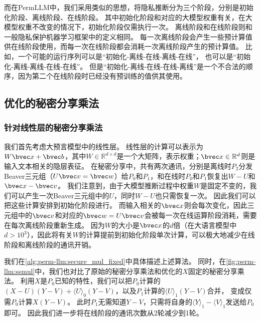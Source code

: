 %
而在PermLLM中，我们采用类似的思想，将隐私推断分为三个阶段，分别是初始化阶段、离线阶段、在线阶段。
%
其中初始化阶段和对应的大模型权重有关，在大模型权重不改变的情况下，初始化阶段仅需执行一次。
%
离线阶段和在线阶段则和一般隐私保护机器学习框架中的定义相同。
每一次离线阶段会产生一些预计算值供在线阶段使用，而每一次在线阶段都会消耗一次离线阶段产生的预计算值。
%
比如，一个可能的运行序列可以是“初始化-离线-在线-离线-在线”，
也可以是“初始化-离线-离线-在线-在线”。
但是“初始化-离线-在线-在线-离线”是一个不合法的顺序，因为第二个在线阶段时已经没有预训练的值供其使用。

\subsection{优化的秘密分享乘法}


\subsubsection{针对线性层的秘密分享乘法}
我们首先考虑大预言模型中的线性层。
%
线性层的计算可以表示为$W \bvec x + \bvec b$，其中$W \in \mathbb R^{d\times d}$是一个大矩阵，表示权重；$\bvec x \in \mathbb R^{d}$则是输入文本相关的隐层表征。
%
在秘密分享中，共有两次通讯，分别是离线时$P_2$分发Beaver三元组（$U\bvec v = \bvec w$）给$P_0$和$P_1$，和在线时$P_0$和$P_1$恢复出$W - U$和$\bvec x - \bvec v$。
%
我们注意到，由于大模型推断过程中权重$W$是固定不变的，我们可以产生一次Beaver三元组中的$U$，同时$W - U$也只需恢复一次。
因此我们可以把这些计算安排到初始化阶段进行。
%
而输入相关的$\bvec x$则会每次变化，因此三元组中的$\bvec v$和对应的$\bvec w=U\bvec v$会被每一次在线运算阶段消耗，需要在每次离线阶段重新生成。
%
因为$W$的大小是$\bvec x$的$d$倍（在大语言模型中$d > 10^3$），因此将有关$W$的计算提前到初始化阶段单次计算，可以极大地减少在线阶段和离线阶段的通讯开销。


我们在\autoref{alg:perm-llm:secure_mul_fixed}中具体描述上述算法。
同时，在\autoref{fig:perm-llm:ssmul}中，我们也对比了原始的秘密分享乘法和优化的$X$固定的秘密分享乘法。
%
利用$X$是$P_0$已知的特性，我们可以把$P_0$计算的$(X-U)(Y-V) + \langle U \rangle_0(Y-V)$，以及$P_1$计算的$\langle U \rangle_1(Y-V)$合并，
变成仅需$P_0$计算$X(Y-V)$。
%
此时$P_1$无需知道$Y-V$，只需将自身的$\langle Y \rangle_1 - \langle V \rangle_1$发送给$P_0$即可。
因此我们进一步将在线阶段的通讯次数从2轮减少到1轮。
%



